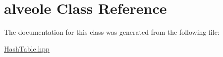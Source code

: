 \hypertarget{classalveole}{\section{alveole Class Reference}
\label{classalveole}
}


The documentation for this class was generated from the following file\-:\begin{DoxyCompactItemize}
\item 
\hyperlink{_hash_table_8hpp}{Hash\-Table.\-hpp}\end{DoxyCompactItemize}
